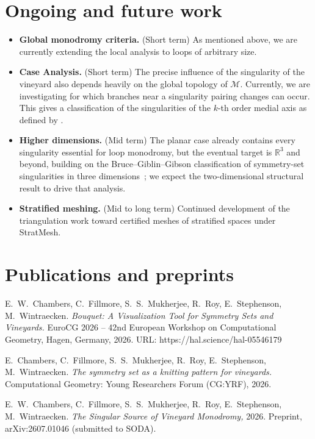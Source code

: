 \documentclass[10pt]{article}
\newcommand{\R}{\mathbb{R}}
\newcommand{\M}{\mathcal{M}}
\newcommand{\gsym}{\operatorname{gsym}}
\begin{document}
\section{Ongoing and future work}

\begin{itemize}
  \item \textbf{Global monodromy criteria.} (Short term) 
  As mentioned above, we are currently extending the local analysis to loops of arbitrary size. 
  \item \textbf{Case Analysis.} (Short term) The precise influence of the singularity of the vineyard also depends heavily on the global topology of $\M$. Currently, we are investigating for which branches near a singularity pairing changes can occur. This gives a classification of the singularities of the $k$-th order medial axis as defined by \cite{edelsbrunner2025mid}.
  \item \textbf{Higher dimensions.} (Mid term) The planar case already contains every singularity essential for loop monodromy, but the eventual target is $\R^3$ and beyond, building on the Bruce--Giblin--Gibson classification of symmetry-set singularities in three dimensions~\cite{bruce1985symmetry}; we expect the two-dimensional structural result to drive that analysis.
  \item \textbf{Stratified meshing.} (Mid to long term) Continued development of the triangulation work toward certified meshes of stratified spaces under StratMesh.
\end{itemize}

\pagebreak
\section*{Publications and preprints}
{\footnotesize
\begin{enumerate}[label={[\arabic*]},leftmargin=2.2em]
  \item E.~W.~Chambers, C.~Fillmore, S.~S.~Mukherjee, R.~Roy, E.~Stephenson, M.~Wintraecken. \emph{Bouquet: A Visualization Tool for Symmetry Sets and Vineyards.} EuroCG 2026 -- 42nd European Workshop on Computational Geometry, Hagen, Germany, 2026. URL: https://hal.science/hal-05546179
  \item E.~Chambers, C.~Fillmore, S.~S.~Mukherjee, R.~Roy, E.~Stephenson, M.~Wintraecken. \emph{The symmetry set as a knitting pattern for vineyards.} Computational Geometry: Young Researchers Forum (CG:YRF), 2026.
  \item E.~W.~Chambers, C.~Fillmore, S.~S.~Mukherjee, R.~Roy, E.~Stephenson, M.~Wintraecken. \emph{The Singular Source of Vineyard Monodromy,} 2026. Preprint, arXiv:2607.01046 (submitted to SODA).
\end{enumerate}
}

\renewcommand{\refname}{Selected references}
\nocite{*}
{\footnotesize


}
\end{document}

